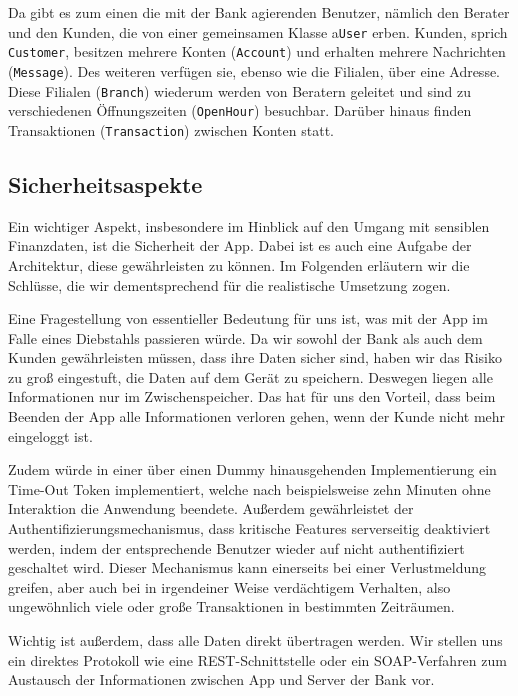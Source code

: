 	
	
	Da gibt es zum einen die mit der Bank agierenden Benutzer, nämlich den Berater und den Kunden, die von einer gemeinsamen Klasse a\texttt{User} erben. Kunden, sprich \texttt{Customer}, besitzen mehrere Konten (\texttt{Account}) und erhalten mehrere Nachrichten (\texttt{Message}). Des weiteren verfügen sie, ebenso wie die Filialen,  über eine Adresse. Diese Filialen (\texttt{Branch}) wiederum werden von Beratern geleitet und sind zu verschiedenen Öffnungszeiten (\texttt{OpenHour}) besuchbar. Darüber hinaus finden Transaktionen (\texttt{Transaction}) zwischen Konten statt.

\subsection{Sicherheitsaspekte}
	Ein wichtiger Aspekt, insbesondere im Hinblick auf den Umgang mit sensiblen Finanzdaten, ist die Sicherheit der App. Dabei ist es auch eine Aufgabe der Architektur, diese gewährleisten zu können. Im Folgenden erläutern wir die Schlüsse, die wir dementsprechend für die realistische Umsetzung zogen.
	
	Eine Fragestellung von essentieller Bedeutung für uns ist, was mit der App im Falle eines Diebstahls passieren würde. Da wir sowohl der Bank als auch dem Kunden gewährleisten müssen, dass ihre Daten sicher sind, haben wir das Risiko zu groß eingestuft, die Daten auf dem Gerät zu speichern. Deswegen liegen alle Informationen nur im Zwischenspeicher. Das hat für uns den Vorteil, dass beim Beenden der App alle Informationen verloren gehen, wenn der Kunde nicht mehr eingeloggt ist.
	
	Zudem würde in einer über einen Dummy hinausgehenden Implementierung ein Time-Out Token implementiert, welche nach beispielsweise zehn Minuten ohne Interaktion die Anwendung beendete. Außerdem gewährleistet der Authentifizierungsmechanismus, dass kritische Features serverseitig deaktiviert werden, indem der entsprechende Benutzer wieder auf nicht authentifiziert geschaltet wird. Dieser Mechanismus kann einerseits bei einer Verlustmeldung greifen, aber auch bei in irgendeiner Weise verdächtigem Verhalten, also ungewöhnlich viele oder große Transaktionen in bestimmten Zeiträumen.
	
	Wichtig ist außerdem, dass alle Daten direkt übertragen werden. Wir stellen uns ein direktes Protokoll wie eine \acs{REST}-Schnittstelle oder ein \acs{SOAP}-Verfahren zum Austausch der Informationen zwischen App und Server der Bank vor.
	
